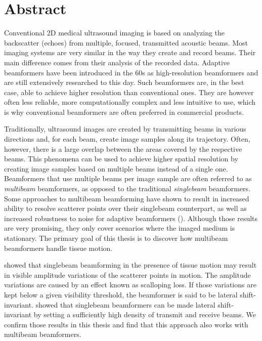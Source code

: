 
\chapter*{Abstract}
Conventional 2D medical ultrasound imaging is based on analyzing the backscatter 
(echoes) from multiple, focused, transmitted acoustic beams.
Most imaging systems are very similar in the way they create and record beams. Their main difference comes from their analysis of the recorded data.
Adaptive beamformers have been introduced in the 60s as high-resolution beamformers and are still extensively researched to this day. Such beamformers are, in the best case, able to achieve higher resolution than conventional ones. They are however often less reliable, more computationally complex and less intuitive to use, which is why conventional beamformers are often preferred in commercial products.

Traditionally, ultrasound images are created by transmitting beams in various directions and, for each beam, create image samples along its trajectory.
Often, however, there is a large overlap between the areas covered by the respective beams.
This phenomena can be used to achieve higher spatial resolution by creating image samples based on multiple beams instead of a single one.
Beamformers that use multiple beams per image sample are often referred to as \textit{multibeam} beamformers, as opposed to the traditional \textit{singlebeam} beamformers.
Some approaches to multibeam beamforming have shown to result in increased ability to resolve scatterer points over their singlebeam counterpart, as well as increased robustness to noise for adaptive beamformers (\cite{Jensen_multibeam}).
Although those results are very promising, they only cover scenarios where the imaged medium is stationary.
The primary goal of this thesis is to discover how multibeam beamformers handle tissue motion.

\cite{Asen_shift_invariance} showed that singlebeam beamforming in the presence of tissue motion may result in visible amplitude variations of the scatterer points in motion. The amplitude variations are caused by an effect known as scalloping loss. If those variations are kept below a given visibility threshold, the beamformer is said to be lateral shift-invariant.
\cite{Asen_shift_invariance} showed that singlebeam beamformers can be made lateral shift-invariant by setting a sufficiently high density of transmit and receive beams.
We confirm those results in this thesis and find that this approach also works with multibeam beamformers.

